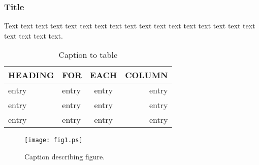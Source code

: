 \documentclass[preprint]{iucr}              %
\begin{document}
\subsubsection{Title}

Text text text text text text text text text text text text text text
text text text text text text text.










\begin{table}
\caption{Caption to table}
\begin{tabular}{llcr}      %
 HEADING    & FOR        & EACH       & COLUMN     \\
\hline
 entry      & entry      & entry      & entry      \\
 entry      & entry      & entry      & entry      \\
 entry      & entry      & entry      & entry      \\
\end{tabular}
\end{table}


\begin{figure}
\caption{Caption describing figure.}
\texttt{[image: fig1.ps]}
\end{figure}
\end{document}
